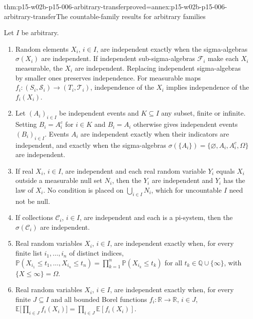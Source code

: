 \begin{hbtheorem}{thm:p15-w02b-p15-006-arbitrary-transfer}{proved=annex:p15-w02b-p15-006-arbitrary-transfer}{The countable-family results for arbitrary families}
\par\nobreak
Let \(I\) be arbitrary.
\begin{enumerate}
\item Random elements \(X_i\), \(i\in I\), are independent exactly
      when the sigma-algebras \(\sigma(X_i)\) are independent. If
      independent sub-sigma-algebras \(\mathcal F_i\) make each
      \(X_i\) measurable, the \(X_i\) are independent. Replacing
      independent sigma-algebras by smaller ones preserves independence.
      For measurable maps \(f_i:(S_i,\mathcal S_i)\to(T_i,\mathcal T_i)\),
      independence of the \(X_i\) implies independence of the
      \(f_i(X_i)\).
\item Let \((A_i)_{i\in I}\) be independent events and \(K\subseteq I\)
      any subset, finite or infinite. Setting \(B_i=A_i^c\) for
      \(i\in K\) and \(B_i=A_i\) otherwise gives independent events
      \((B_i)_{i\in I}\). Events \(A_i\) are independent exactly when
      their indicators are independent, and exactly when the
      sigma-algebras \(\sigma(\{A_i\})=\{\varnothing,A_i,A_i^c,\Omega\}\)
      are independent.
\item If real \(X_i\), \(i\in I\), are independent and each real
      random variable \(Y_i\) equals \(X_i\) outside a measurable null
      set \(N_i\), then the \(Y_i\) are independent and \(Y_i\) has the
      law of \(X_i\). No condition is placed on
      \(\bigcup_{i\in I}N_i\), which for uncountable \(I\) need not be
      null.
\item If collections \(\mathcal C_i\), \(i\in I\), are independent and
      each is a pi-system, then the \(\sigma(\mathcal C_i)\) are
      independent.
\item Real random variables \(X_i\), \(i\in I\), are independent
      exactly when, for every finite list \(i_1,\ldots,i_n\) of
      distinct indices,
      \(\mathbb P(X_{i_1}\leq t_1,\ldots,X_{i_n}\leq t_n)
      =\prod_{k=1}^n\mathbb P(X_{i_k}\leq t_k)\)
      for all \(t_k\in\mathbb Q\cup\{\infty\}\), with
      \(\{X\leq\infty\}=\Omega\).
\item Real random variables \(X_i\), \(i\in I\), are independent
      exactly when, for every finite \(J\subseteq I\) and all bounded
      Borel functions \(f_i:\mathbb R\to\mathbb R\), \(i\in J\),
      \(\mathbb E\bigl[\prod_{i\in J}f_i(X_i)\bigr]
      =\prod_{i\in J}\mathbb E[f_i(X_i)]\).

\end{enumerate}
\end{hbtheorem}

